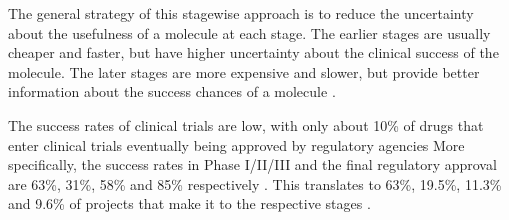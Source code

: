 The general strategy of this stagewise approach is to reduce the uncertainty about the usefulness of
a molecule at each stage. The earlier stages are usually cheaper and faster, but have higher
uncertainty about the clinical success of the molecule. The later stages are more expensive and
slower, but provide better information about the success chances of a molecule \citep{todo}.

The success rates of clinical trials are low, with only about 10\% of drugs that enter clinical
trials eventually being approved by regulatory agencies More specifically, the success rates in
Phase I/II/III and the final regulatory approval are 63\%, 31\%, 58\% and 85\% respectively
\citep{mullardParsingClinicalSuccess2016}. This translates to 63\%, 19.5\%, 11.3\% and 9.6\% of
projects that make it to the respective stages \citep{mullardParsingClinicalSuccess2016}.

